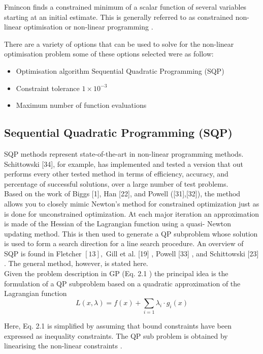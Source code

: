 \documentclass{UoNMCHA}
\numberwithin{equation}{section}
\begin{document}
	Fmincon finds a constrained minimum of a scalar function of several variables starting at an initial estimate. This is generally referred to as constrained non-linear optimisation or non-linear programming \cite{rabaey_optimization}.
	
	There are a variety of options that can be used to solve for the non-linear optimisation problem some of these options selected were as follow:
	
\begin{itemize}
	\item Optimisation algorithm
	\subitem Sequential Quadratic Programming (SQP)
	\item Constraint tolerance
	\subitem $ 1 \times 10^{-3} $
	\item Maximum number of function evaluations
\end{itemize} 
	
	\subsection{Sequential Quadratic Programming (SQP)}
	
	SQP methods represent state-of-the-art in non-linear programming methods. Schittowski [34], for
	example, has implemented and tested a version that out performs every other tested method in terms of
	efficiency, accuracy, and percentage of successful solutions, over a large number of test problems.\\
	Based on the work of Biggs [1], Han [22], and Powell ([31],[32]), the method allows you to closely
	mimic Newton's method for constrained optimization just as is done for unconstrained optimization. At
	each major iteration an approximation is made of the Hessian of the Lagrangian function using a quasi-
	Newton updating method. This is then used to generate a QP subproblem whose solution is used to
	form a search direction for a line search procedure. An overview of SQP is found in Fletcher $[13],$ Gill
	et al. [19] , Powell [33] , and Schittowski [23] . The general method, however, is stated here.\\
	
	Given the problem description in GP (Eq. 2.1 ) the principal idea is the formulation of a QP subproblem
	based on a quadratic approximation of the Lagrangian function
	$$
	L(x, \lambda)=f(x)+\sum_{i=1} \lambda_{i} \cdot g_{i}(x)
	$$
	
	Here, Eq. 2.1 is simplified by assuming that bound constraints have been expressed as inequality constraints. The QP sub problem is obtained by linearising the non-linear constraints \cite{a2001_computation}.
\end{document}
